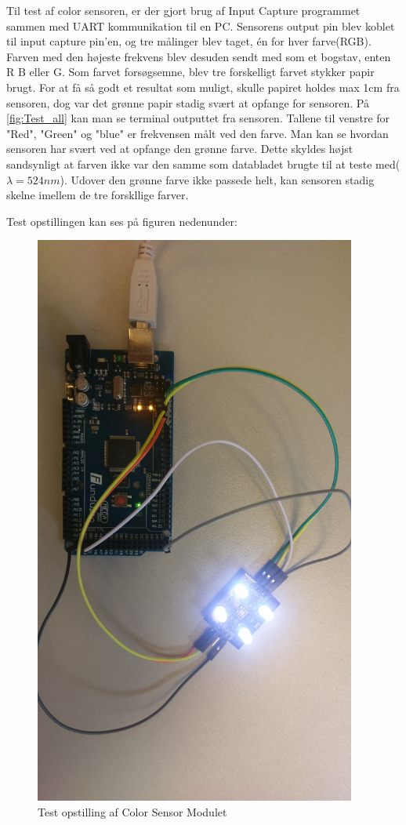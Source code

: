 Til test af color sensoren, er der gjort brug af Input Capture programmet sammen med UART kommunikation til en PC. Sensorens output pin blev koblet til input capture pin'en, og tre målinger blev taget, én for hver farve(RGB). Farven med den højeste frekvens blev desuden sendt med som et bogstav, enten R B eller G. Som farvet forsøgsemne, blev tre forskelligt farvet stykker papir brugt. For at få så godt et resultat som muligt, skulle papiret holdes max 1cm fra sensoren, dog var det grønne papir stadig svært at opfange for sensoren. På \autoref{fig:Test_all} kan man se terminal outputtet fra sensoren. Tallene til venstre for "Red", "Green" og "blue" er frekvensen målt ved den farve. Man kan se hvordan sensoren har svært ved at opfange den grønne farve. Dette skyldes højst sandsynligt at farven ikke var den samme som databladet brugte til at teste med($\lambda = 524 nm$)\cite{man:TC3200}. Udover den grønne farve ikke passede helt, kan sensoren stadig skelne imellem de tre forskllige farver. 

Test opstillingen kan ses på figuren nedenunder:

\begin{figure}[H]
	\centering
	\includegraphics[width = 300pt]{Img/TestOpstilling.jpg}
	\caption{Test opstilling af Color Sensor Modulet}
	\label{fig:Test_opstilling}
\end{figure}


